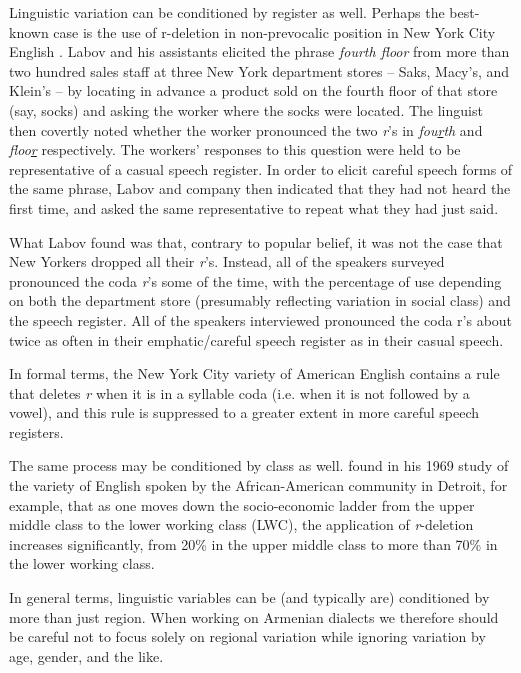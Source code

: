 \documentclass[output=paper]{langscibook}
\begin{document}
Linguistic variation can be conditioned by register as well. Perhaps the best-known case is the use of r-deletion in non-prevocalic position in New York City English \citep{Labov-1966-socialstratificationEnglishNewYorkCity,Labov-1972-Sociolinguisticpatterns}. Labov and his assistants elicited the phrase \textit{fourth floor} from more than two hundred sales staff at three New York department stores -- Saks, Macy's, and Klein's -- by locating in advance a product sold on the fourth floor of that store (say, socks) and asking the worker where the socks were located. The linguist then covertly noted whether the worker pronounced the two \textit{r}'s in \textit{fou\underline{r}th} and \textit{floo\underline{r}} respectively. The workers' responses to this question were held to be representative of a  casual speech  register. In order to elicit  careful speech   forms of the same phrase, Labov and company then indicated that they had not heard the first time, and asked the same representative to repeat what they had just said.

What Labov found was that, contrary to popular belief, it was not the case that New Yorkers dropped all their \textit{r}'s. Instead, all of the speakers surveyed pronounced the coda \textit{r}'s some of the time, with the percentage of use depending on both the department store (presumably reflecting variation in social class) and the speech register. All of the speakers interviewed pronounced the coda r's about twice as often in their emphatic/careful speech register as in their casual speech.

In formal terms, the New York City variety of American English contains a rule that deletes \textit{r} when it is in a syllable coda (i.e. when it is not followed by a vowel), and this rule is suppressed to a greater extent in more careful speech registers.

The same process may be conditioned by class as well. \citet{Wolfram-1969-sociolinguisticdescriptionDetroitNegroSpeech} found in his 1969 study of  the variety of English spoken by the African-American community in Detroit, for example, that as one moves down the socio-economic ladder from the upper middle class to the lower working class (LWC), the application of \textit{r}-deletion increases significantly, from 20\% in the upper middle class to more than 70\% in the lower working class.

In general terms, linguistic variables can be (and typically are) conditioned by more than just region. When working on Armenian dialects we therefore should be careful not to focus solely on regional variation while ignoring variation by age, gender, and the like.
\end{document}
